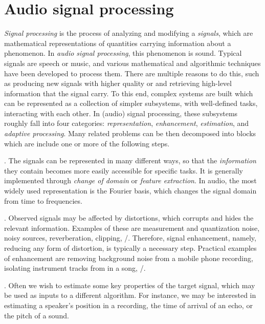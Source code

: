 \section{Audio signal processing}\label{sec:intro:processing}
\textit{Signal processing} is the process of analyzing and modifying a \textit{signals}, which are mathematical representations of quantities carrying information about a phenomenon.
In \textit{audio signal processing}, this phenomenon is sound.
Typical signals are speech or music, and various mathematical and algorithmic techniques have been developed to process them.
There are multiple reasons to do this, such as producing new signals with higher quality or and retrieving high-level information that the signal carry.
To this end, complex systems are built which can be represented as a collection of simpler subsystems, with well-defined tasks, interacting with each other.
In (audio) signal processing, these subsystems roughly fall into four categories: \textit{representation}, \textit{enhancement}, \textit{estimation}, and \textit{adaptive processing}.
Many related problems can be then decomposed into blocks which are include one or more of the following steps.

.
    The signals can be represented in many different ways, so that the \textit{information} they contain becomes more easily accessible for specific tasks.
    It is generally implemented through \textit{change of domain} or \textit{feature extraction}.
    In audio, the most widely used representation is the Fourier basis, which changes the signal domain from time to frequencies.

.
    Observed signals may be affected by distortions, which corrupts and hides the relevant information.
    Examples of these are measurement and quantization noise, noisy sources, reverberation, clipping, \etc/.
    Therefore, signal enhancement, namely, reducing any form of distortion, is typically a necessary step.
    Practical examples of enhancement are removing background noise from a mobile phone recording, isolating instrument tracks from in a song, \etc/.

.
    Often we wish to estimate some key properties of the target signal, which may be used as inputs to a different algorithm.
    For instance, we may be interested in estimating a speaker's position in a recording, the time of arrival of an echo, or the pitch of a sound.

